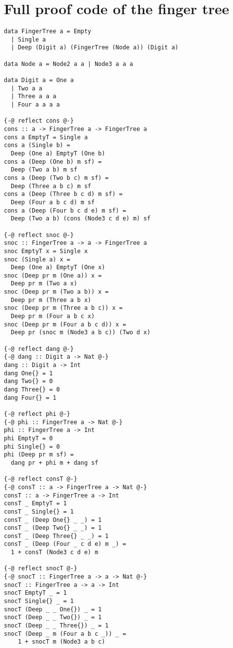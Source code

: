 \documentclass[sigplan,screen,review,anonymous]{acmart}
\begin{document}
\section{Full proof code of the finger tree}\label{ap:fingertree}

\begin{lstlisting}
data FingerTree a = Empty
  | Single a
  | Deep (Digit a) (FingerTree (Node a)) (Digit a)

data Node a = Node2 a a | Node3 a a a

data Digit a = One a
  | Two a a
  | Three a a a
  | Four a a a a

{-@ reflect cons @-}
cons :: a -> FingerTree a -> FingerTree a
cons a EmptyT = Single a
cons a (Single b) =
  Deep (One a) EmptyT (One b)
cons a (Deep (One b) m sf) =
  Deep (Two a b) m sf
cons a (Deep (Two b c) m sf) =
  Deep (Three a b c) m sf
cons a (Deep (Three b c d) m sf) =
  Deep (Four a b c d) m sf
cons a (Deep (Four b c d e) m sf) =
  Deep (Two a b) (cons (Node3 c d e) m) sf

{-@ reflect snoc @-}
snoc :: FingerTree a -> a -> FingerTree a
snoc EmptyT x = Single x
snoc (Single a) x =
  Deep (One a) EmptyT (One x)
snoc (Deep pr m (One a)) x =
  Deep pr m (Two a x)
snoc (Deep pr m (Two a b)) x =
  Deep pr m (Three a b x)
snoc (Deep pr m (Three a b c)) x =
  Deep pr m (Four a b c x)
snoc (Deep pr m (Four a b c d)) x =
  Deep pr (snoc m (Node3 a b c)) (Two d x)

{-@ reflect dang @-}
{-@ dang :: Digit a -> Nat @-}
dang :: Digit a -> Int
dang One{} = 1
dang Two{} = 0
dang Three{} = 0
dang Four{} = 1

{-@ reflect phi @-}
{-@ phi :: FingerTree a -> Nat @-}
phi :: FingerTree a -> Int
phi EmptyT = 0
phi Single{} = 0
phi (Deep pr m sf) =
  dang pr + phi m + dang sf

{-@ reflect consT @-}
{-@ consT :: a -> FingerTree a -> Nat @-}
consT :: a -> FingerTree a -> Int
consT _ EmptyT = 1
consT _ Single{} = 1
consT _ (Deep One{} _ _) = 1
consT _ (Deep Two{} _ _) = 1
consT _ (Deep Three{} _ _) = 1
consT _ (Deep (Four _ c d e) m _) =
  1 + consT (Node3 c d e) m

{-@ reflect snocT @-}
{-@ snocT :: FingerTree a -> a -> Nat @-}
snocT :: FingerTree a -> a -> Int
snocT EmptyT _ = 1
snocT Single{} _ = 1
snocT (Deep _ _ One{}) _ = 1
snocT (Deep _ _ Two{}) _ = 1
snocT (Deep _ _ Three{}) _ = 1
snocT (Deep _ m (Four a b c _)) _ =
    1 + snocT m (Node3 a b c)


\end{lstlisting}
\end{document}

